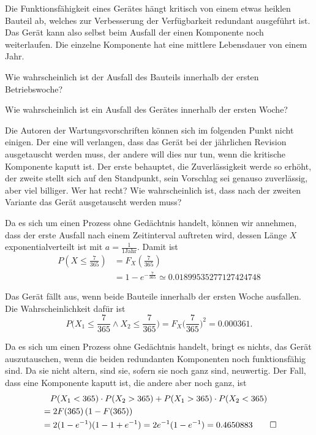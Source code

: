 Die Funktionsfähigkeit eines Gerätes hängt kritisch von einem etwas
heiklen Bauteil ab, welches zur Verbesserung der Verfügbarkeit redundant
ausgeführt ist. Das Gerät kann also selbst beim Ausfall der einen
Komponente noch weiterlaufen. Die einzelne Komponente hat eine mittlere
Lebensdauer von einem Jahr.
\begin{teilaufgaben}
\item Wie wahrscheinlich ist der Ausfall des Bauteils innerhalb der
ersten Betriebswoche?
\item Wie wahrscheinlich ist ein Ausfall des Gerätes innerhalb der
ersten Woche?
\item Die Autoren der Wartungsvorschriften können sich im folgenden Punkt
nicht einigen. Der eine will verlangen, dass das Gerät bei der jährlichen
Revision ausgetauscht werden muss, der andere will dies nur tun, wenn
die kritische Komponente kaputt ist.
Der erste behauptet, die Zuverlässigkeit werde so erhöht, der zweite
stellt sich auf den Standpunkt, sein Vorschlag sei genauso zuverlässig,
aber viel billiger. Wer hat recht? Wie wahrscheinlich ist, dass nach der
zweiten Variante das Gerät ausgetauscht werden muss?
\end{teilaufgaben}

\begin{loesung}
\begin{teilaufgaben}
\item Da es sich um einen Prozess ohne Gedächtnis handelt, können wir
annehmen, dass der erste Ausfall nach einem Zeitinterval auftreten
wird, dessen Länge $X$ exponentialverteilt ist mit $a=\frac1{1\text{Jahr}}$.
Damit ist
\begin{align*}
P\left(X\le \frac{7}{365}\right)
&=
F_X\left(\frac{7}{365}\right)\\
&=
1-e^{-\frac{7}{365}}
\simeq
0.01899535277127424748
\end{align*}
\item
Das Gerät fällt aus, wenn beide Bauteile innerhalb der ersten
Woche ausfallen. Die Wahrscheinlichkeit dafür ist
\[
P\biggl(X_1\le \frac{7}{365}\wedge X_2\le \frac{7}{365}\biggr)
=F_X\biggl(\frac{7}{365}\biggr)^2=0.000361.
\]
\item
Da es sich um einen Prozess ohne Gedächtnis handelt, bringt es
nichts, das Gerät auszutauschen, wenn die beiden redundanten Komponenten
noch funktionsfähig sind. Da sie nicht altern, sind sie, sofern sie
noch ganz sind, neuwertig.
Der Fall, dass eine Komponente kaputt ist, die andere aber noch ganz,
ist
\begin{align*}
&\quad P(X_1 < 365)\cdot P(X_2>365)
+P(X_1 > 365)\cdot P(X_2<365)
\\
&=
2F(365)\,(1-F(365))
\\
&=
2(1-e^{-1})(1-1+e^{-1})=2e^{-1}(1-e^{-1})=0.4650883
\qedhere
\end{align*}
\end{teilaufgaben}
\end{loesung}

